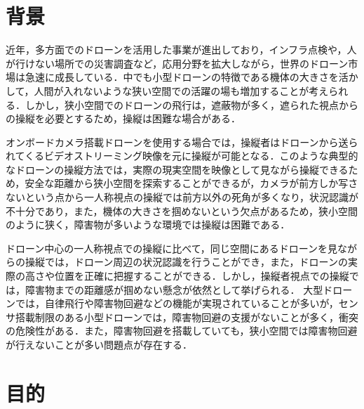 \documentclass
[a4paper,11pt]{jreport}
\begin{document}

\section{背景}

%
近年，多方面でのドローンを活用した事業が進出しており，インフラ点検や，人が行けない場所での災害調査など，応用分野を拡大しながら，世界のドローン市場は急速に成長している\cite{AR}．中でも小型ドローンの特徴である機体の大きさを活かして，人間が入れないような狭い空間での活躍の場も増加することが考えられる．しかし，狭小空間でのドローンの飛行は，遮蔽物が多く，遮られた視点からの操縦を必要とするため，操縦は困難な場合がある．
\par
オンボードカメラ搭載ドローンを使用する場合では，操縦者はドローンから送られてくるビデオストリーミング映像を元に操縦が可能となる．このような典型的なドローンの操縦方法では，実際の現実空間を映像として見ながら操縦できるため，安全な距離から狭小空間を探索することができるが，カメラが前方しか写さないという点から一人称視点の操縦では前方以外の死角が多くなり，状況認識が不十分であり\cite{FPV}，また，機体の大きさを掴めないという欠点があるため，狭小空間のように狭く，障害物が多いような環境では操縦は困難である．
\par
ドローン中心の一人称視点での操縦に比べて，同じ空間にあるドローンを見ながらの操縦では，ドローン周辺の状況認識を行うことができ，また，ドローンの実際の高さや位置を正確に把握することができる．しかし，操縦者視点での操縦では，障害物までの距離感が掴めない懸念が依然として挙げられる．
大型ドローンでは，自律飛行や障害物回避などの機能が実現されていることが多いが，センサ搭載制限のある小型ドローンでは，障害物回避の支援がないことが多く，衝突の危険性がある．また，障害物回避を搭載していても，狭小空間では障害物回避が行えないことが多い問題点が存在する．

\section{目的}
\end{document}
